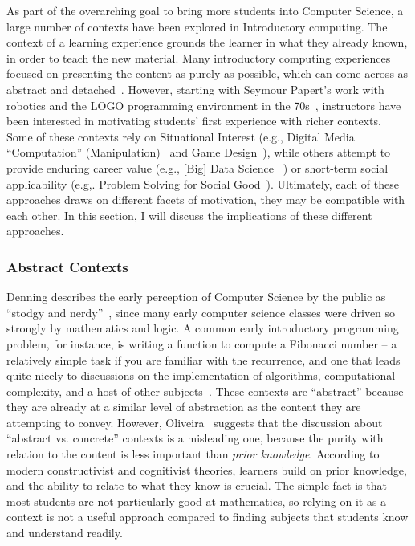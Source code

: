 As part of the overarching goal to bring more students into Computer Science, a large number of contexts have been explored in Introductory computing. 
The context of a learning experience grounds the learner in what they already known, in order to teach the new material.
Many introductory computing experiences focused on presenting the content as purely as possible, which can come across as abstract and detached~\cite{Zografski}.
However, starting with Seymour Papert's work with robotics and the LOGO programming environment in the 70s~\cite{papert1996}, instructors have been interested in motivating students' first experience with richer contexts.
Some of these contexts rely on Situational Interest (e.g.,  Digital Media ``Computation'' (Manipulation)~\cite{Forte} and Game Design~\cite{Zografski}), while others attempt to provide enduring career value (e.g., [Big] Data Science ~\cite{Anderson}) or short-term social applicability (e.g,. Problem Solving for Social Good~\cite{SocialGoodinComputingEducation}).
Ultimately, each of these approaches draws on different facets of motivation, they may be compatible with each other.
In this section, I will discuss the implications of these different approaches.


\subsubsection{Abstract Contexts}

Denning describes the early perception of Computer Science by the public as ``stodgy and nerdy''~\cite{Denning:2005}, since many early computer science classes were driven so strongly by mathematics and logic.
A common early introductory programming problem, for instance, is writing a function to compute a Fibonacci number -- a relatively simple task if you are familiar with the recurrence, and one that leads quite nicely to discussions on the implementation of algorithms, computational complexity, and a host of other subjects~\cite{crazypantsfibonaccipaper}.
These contexts are ``abstract'' because they are already at a similar level of abstraction as the content they are attempting to convey.
However, Oliveira~\cite{ConcreteVsAbstract} suggests that the discussion about ``abstract vs. concrete'' contexts is a misleading one, because the purity with relation to the content is less important than \textit{prior knowledge}.
According to modern constructivist and cognitivist theories, learners build on prior knowledge, and the ability to relate to what they know is crucial.
The simple fact is that most students are not particularly good at mathematics, so relying on it as a context is not a useful approach compared to finding subjects that students know and understand readily.

